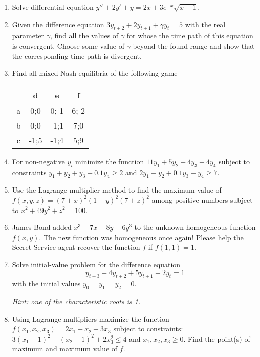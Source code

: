 \begin{enumerate}

\item Solve differential equation $y''+2y'+y=2x+3e^{-x} \sqrt{x+1} $.

\item Given the difference equation $3y_{t+2} +2y_{t+1} +\gamma y_{t} =5$ with the real parameter $\gamma $, find all the values of  $\gamma$ for whose the time path of this equation is convergent.
Choose some value of $\gamma$ beyond the found range and show that the corresponding time path is divergent.


\item Find all mixed Nash equilibria of the following game

\begin{tabular}{c|ccc}
  & d & e & f \\
\midrule
a & 0;0  & 0;-1 & 6;-2 \\
b & 0;0  & -1;1 & 7;0 \\
c & -1;5 & -1;4 & 5;9
\end{tabular}

\item For non-negative $y_i$ minimize the function $11y_1 + 5 y_2 + 4y_3 +4y_4$ subject to constraints $y_1 + y_2 + y_3 +0.1y_4 \geq 2$ and $2y_1+y_2+0.1y_3+y_4 \geq 7$.


\item Use the Lagrange multiplier method to find the maximum value of $f(x,y,z)=(7+x)^2(1+y)^2(7+z)^2$ among positive numbers subject to $x^2 + 49y^2 + z^2 = 100$.

\item James Bond added $x^3+7x-8y - 6y^3$ to the unknown homogeneous function $f(x, y)$. The new function was homogeneous once again! Please help the Secret Service agent recover the function $f$ if $f(1, 1)=1$.


\item Solve initial-value problem for the difference equation
\[
y_{t+3} -4y_{t+2} +5y_{t+1} -2y_{t} =1
\]
with the initial values $y_{0} =y_{1} =y_{2} =0$.

\textit{Hint: one of the characteristic roots is 1.}

\item Using Lagrange multipliers maximize the function $f(x_1,x_2,x_3)=2x_1-x_2-3x_3$ subject to constraints:   $3(x_1-1)^2+(x_2+1)^2+2x_3^2\leq 4$ and $x_1, x_2, x_3 \geq 0$. Find the point(s) of maximum and maximum value of $f$.

\end{enumerate}

